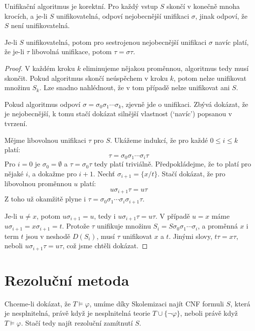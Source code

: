 \begin{proposition}\label{proposition:unification-algorithm}
Unifikační algoritmus je korektní. Pro každý vstup $S$ skončí v konečně mnoha krocích, a je-li $S$ unifikovatelná, odpoví nejobecnější unifikaci $\sigma$, jinak odpoví, že $S$ není unifikovatelná.

Je-li $S$ unifikovatelná, potom pro sestrojenou nejobecnější unifikaci $\sigma$ navíc platí, že je-li $\tau$ libovolná unifikace, potom $\tau=\sigma\tau$.
\end{proposition}
\begin{proof}
V každém kroku $k$ eliminujeme nějakou proměnnou, algoritmus tedy musí skončit. Pokud algoritmus skončí neúspěchem v kroku $k$, potom nelze unifikovat množinu $S_k$. Lze snadno nahlédnout, že v tom případě nelze unifikovat ani $S$.

Pokud algoritmus odpoví $\sigma=\sigma_0\sigma_1\cdots\sigma_k$, zjevně jde o unifikaci. Zbývá dokázat, že je nejobecnější, k tomu stačí dokázat silnější vlastnost (`navíc') popsanou v tvrzení.

Mějme libovolnou unifikaci $\tau$ pro $S$. Ukážeme indukcí, že pro každé $0\leq i\leq k$ platí:
$$
\tau=\sigma_0\sigma_1\cdots\sigma_i\tau
$$
Pro $i=0$ je $\sigma_0=\emptyset$ a $\tau=\sigma_0\tau$ tedy platí triviálně. Předpokládejme, že to platí pro nějaké $i$, a dokažme pro $i+1$. Nechť $\sigma_{i+1}=\{x/t\}$. Stačí dokázat, že pro libovolnou proměnnou $u$ platí:
$$
u\sigma_{i+1}\tau=u\tau
$$
Z toho už okamžitě plyne i $\tau=\sigma_0\sigma_1\cdots\sigma_i\sigma_{i+1}\tau$.

Je-li $u\neq x$, potom $u\sigma_{i+1}=u$, tedy i $u\sigma_{i+1}\tau=u\tau$. V případě $u=x$ máme $u\sigma_{i+1}=x\sigma_{i+1}=t$. Protože $\tau$ unifikuje množinu $S_i=S\sigma_0\sigma_1\cdots\sigma_i$, a proměnná $x$ i term $t$ jsou v neshodě $D(S_i)$, musí $\tau$ unifikovat $x$ a $t$. Jinými slovy, $t\tau=x\tau$, neboli $u\sigma_{i+1}\tau=u\tau$, což jsme chtěli dokázat.
\end{proof}


\section{Rezoluční metoda}\label{section:predicate-resolution-method}

Chceme-li dokázat, že $T\models\varphi$, umíme díky Skolemizaci najít CNF formuli $S$, která je nesplnitelná, právě když je nesplnitelná teorie $T\cup\{\neg\varphi\}$, neboli právě když $T\models\varphi$. Stačí tedy najít rezoluční zamítnutí $S$.

